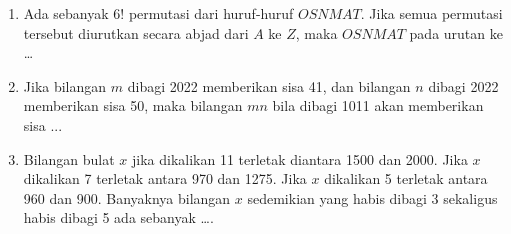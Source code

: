 \documentclass[12pt]{scrartcl}
\begin{document}
\begin{enumerate}
    \item Ada sebanyak $6!$ permutasi dari huruf-huruf $OSNMAT$. Jika semua permutasi tersebut diurutkan secara abjad dari $A$ ke $Z$, maka $OSNMAT$ pada urutan ke \dots

    \item Jika bilangan $m$ dibagi 2022 memberikan sisa 41, dan bilangan $n$ dibagi 2022 memberikan sisa 50, maka bilangan $mn$  bila dibagi 1011 akan memberikan sisa ...

    \item Bilangan bulat $x$ jika dikalikan 11 terletak diantara 1500 dan 2000. Jika $x$ dikalikan 7 terletak antara 970 dan 1275. Jika $x$ dikalikan 5 terletak antara 960 dan 900. Banyaknya bilangan $x$ sedemikian yang habis dibagi 3 sekaligus habis dibagi 5 ada sebanyak ….
\end{enumerate}
\end{document}
